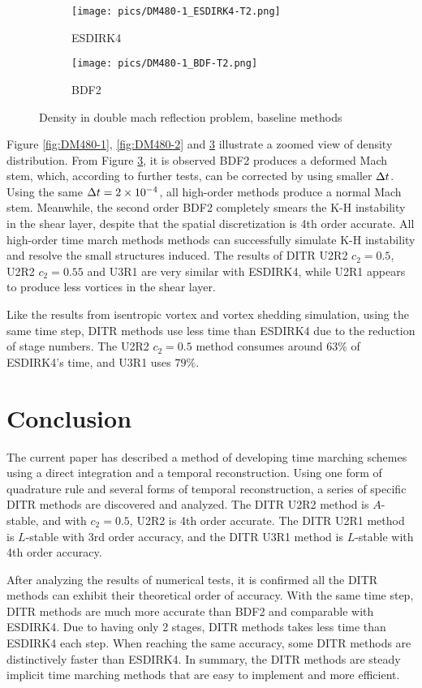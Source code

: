 \begin{figure}[htbp]
    \centering
    \begin{subfigure}{0.5\textwidth}
        \texttt{[image: pics/DM480-1\_ESDIRK4-T2.png]}
        \caption[]{ESDIRK4}
        \label{sfig:DM480_ESDIRK4}
    \end{subfigure}\hfill
    \begin{subfigure}{0.5\textwidth}
        \texttt{[image: pics/DM480-1\_BDF-T2.png]}
        \caption[]{BDF2}
        \label{sfig:DM480_BDF2}
    \end{subfigure}
    \caption{Density in double mach reflection problem, baseline methods}
    \label{fig:DM480-3}
\end{figure}

Figure \ref{fig:DM480-1}, \ref{fig:DM480-2} and \ref{fig:DM480-3}
illustrate a zoomed view of density distribution.
From Figure \ref{fig:DM480-3},
it is observed BDF2 produces
a deformed Mach stem, which, according
to further tests, can be
corrected by using smaller $\mathrm\Delta t$.
Using the same $\mathrm\Delta t= 2\times10^{-4}$,
all high-order methods produce a
normal Mach stem.
Meanwhile, the second order BDF2
completely smears the K-H instability
in the shear layer, despite that the spatial
discretization is 4th order accurate.
All high-order time march methods methods can successfully
simulate K-H instability and resolve the
small structures induced.
The results of DITR U2R2 $c_2=0.5$, U2R2  $c_2=0.55$
and U3R1 are very similar with ESDIRK4, while U2R1
appears to produce less vortices in the shear layer.

Like the results from isentropic vortex and vortex shedding simulation,
using the same time step, DITR methods
use less time than ESDIRK4 due to the reduction of stage numbers.
The U2R2 $c_2=0.5$ method consumes around $63\%$ of ESDIRK4's time,
and U3R1 uses $79\%$.



\section{Conclusion}
\label{sec:Conc}

The current paper has described a method of
developing time marching schemes using a
direct integration and a temporal reconstruction.
Using one form of quadrature rule and several
forms of temporal reconstruction, a series of
specific DITR methods are discovered and analyzed.
The DITR U2R2 method is $A$-stable, and with $c_2=0.5$, U2R2 is 4th order accurate.
The DITR U2R1 method is $L$-stable with 3rd order accuracy, and
the DITR U3R1 method is $L$-stable with 4th order accuracy.

After analyzing the results of numerical tests, it is confirmed
all the DITR methods can exhibit their theoretical order of accuracy.
With the same time step, DITR methods are much more accurate than
BDF2 and comparable with ESDIRK4.
Due to having only 2 stages, DITR methods takes less time than ESDIRK4
each step.
When reaching the same accuracy, some DITR methods are
distinctively faster than ESDIRK4.
In summary, the DITR methods are steady implicit time marching methods
that are easy to implement and more efficient.